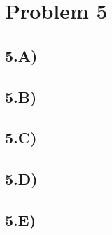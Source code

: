 \section{Problem 5}
\subsection{5.A)}
\subsection{5.B)}
\subsection{5.C)}
\subsection{5.D)}
\subsection{5.E)}